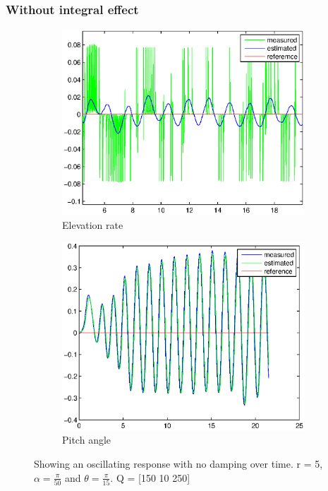 \subsubsection{Without integral effect}

\begin{figure}[H]
\graphicspath{ {Part4_pictures/}}
\begin{subfigure}{0.5\textwidth}
    \includegraphics[width=0.9\linewidth]{Part4_pictures/p4p2_noint/riktig_Q/elevationRate_PDreg_P1.eps} 
    \caption{Elevation rate}
    \label{fig:p4p2nointP4e}
\end{subfigure}
\begin{subfigure}{0.5\textwidth}
    \includegraphics[width=0.9\linewidth]{Part4_pictures/p4p2_noint/riktig_Q/pich_PDreg_P1.eps}
    \caption{Pitch angle}
    \label{fig:p4p2nointP4p}
\end{subfigure}
\caption{Showing an oscillating response with no damping over time. r = 5, $\alpha = \frac{\pi}{50}$ and $\theta = \frac{\pi}{15}$. Q = [150 10 250]}
\label{p4p2nointP4}
\end{figure}

